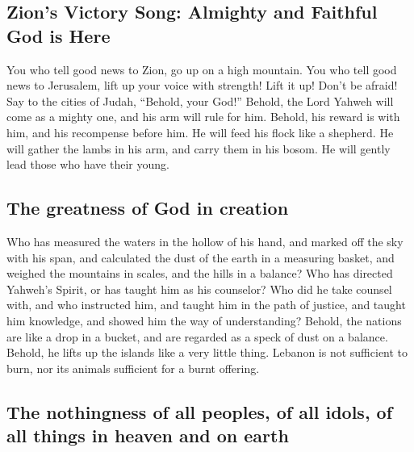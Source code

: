 \begin{paracol}{2}
\begin{otherlanguage}{english}
\hypertarget{zions-victory-song-almighty-and-faithful-god-is-here}{%
\subsection{Zion's Victory Song: Almighty and Faithful God is
Here}\label{zions-victory-song-almighty-and-faithful-god-is-here}}

 You who tell good news to Zion, go up on a high mountain.
You who tell good news to Jerusalem, lift up your voice with strength!
Lift it up! Don't be afraid! Say to the cities of Judah, ``Behold, your
God!''  Behold, the Lord Yahweh will come as a mighty
one, and his arm will rule for him. Behold, his reward is with him, and
his recompense before him.  He will feed his flock like a
shepherd. He will gather the lambs in his arm, and carry them in his
bosom. He will gently lead those who have their young.

\hypertarget{the-greatness-of-god-in-creation}{%
\subsection{The greatness of God in
creation}\label{the-greatness-of-god-in-creation}}

 Who has measured the waters in the hollow of his hand,
and marked off the sky with his span, and calculated the dust of the
earth in a measuring basket, and weighed the mountains in scales, and
the hills in a balance?  Who has directed Yahweh's
Spirit, or has taught him as his counselor?  Who did he
take counsel with, and who instructed him, and taught him in the path of
justice, and taught him knowledge, and showed him the way of
understanding?  Behold, the nations are like a drop in a
bucket, and are regarded as a speck of dust on a balance. Behold, he
lifts up the islands like a very little thing.  Lebanon
is not sufficient to burn, nor its animals sufficient for a burnt
offering.

\hypertarget{the-nothingness-of-all-peoples-of-all-idols-of-all-things-in-heaven-and-on-earth}{%
\subsection{The nothingness of all peoples, of all idols, of all things
in heaven and on
earth}\label{the-nothingness-of-all-peoples-of-all-idols-of-all-things-in-heaven-and-on-earth}}


\end{otherlanguage}
\end{paracol}
